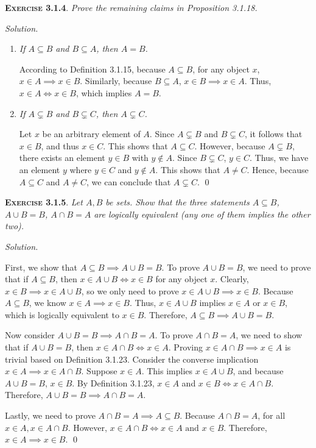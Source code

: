 \documentclass[12pt]{article}
\theoremstyle{remark}
\newenvironment{exer}[2]{
    \noindent \setlength{\parskip}{1em}%
    \textsc{\textbf{Exercise #1}}. \textit{#2} \par
    \noindent \textit{Solution.} %
}{\bigskip}
\begin{document}
\begin{exer}{3.1.4}{
    Prove the remaining claims in Proposition 3.1.18.
}
    \begin{enumerate}[topsep=0mm, label=(\alph*)]
        \item \textit{If $A \subseteq B$ and $B \subseteq A$, then $A = B$.}

            According to Definition 3.1.15, because $A \subseteq B$, for any object $x$, $x \in A \implies x \in B$.
            Similarly, because $B \subseteq A$, $x \in B \implies x \in A$.
            Thus, $x \in A \iff x \in B$, which implies $A = B$.

        \item \textit{If $A \subsetneq B$ and $B \subsetneq C$, then $A \subsetneq C$.}

            Let $x$ be an arbitrary element of $A$.
            Since $A \subsetneq B$ and $B \subsetneq C$, it follows that $x \in B$, and thus $x \in C$.
            This shows that $A \subseteq C$.
            However, because $A \subsetneq B$, there exists an element $y \in B$ with $y \notin A$.
            Since $B \subsetneq C$, $y \in C$.
            Thus, we have an element $y$ where $y \in C$ and $y \notin A$.
            This shows that $A \ne C$.
            Hence, because $A \subseteq C$ and $A \ne C$, we can conclude that $A \subsetneq C$. \qed
    \end{enumerate}
\end{exer}


\begin{exer}{3.1.5}{
    Let $A, B$ be sets.
    Show that the three statements $A \subseteq B$, $A \cup B = B$, $A \cap B = A$ are logically equivalent (any one of them implies the other two).
}
    First, we show that $A \subseteq B \implies A \cup B = B$.
    To prove $A \cup B = B$, we need to prove that if $A \subseteq B$, then $x \in A \cup B \iff x \in B$ for any object $x$.
    Clearly, $x \in B \implies x \in A \cup B$, so we only need to prove $x \in A \cup B \implies x \in B$.
    Because $A \subseteq B$, we know $x \in A \implies x \in B$.
    Thus, $x \in A \cup B$ implies $x \in A$ or $x \in B$, which is logically equivalent to $x \in B$.
    Therefore, $A \subseteq B \implies A \cup B = B$.

    Now consider $A \cup B = B \implies A \cap B = A$.
    To prove $A \cap B = A$, we need to show that if $A \cup B = B$, then $x \in A \cap B \iff x \in A$.
    Proving $x \in A \cap B \implies x \in A$ is trivial based on Definition 3.1.23.
    Consider the converse implication $x \in A \implies x \in A \cap B$.
    Suppose $x \in A$.
    This implies $x \in A \cup B$, and because $A \cup B = B$, $x \in B$.
    By Definition 3.1.23, $x \in A$ and $x \in B \iff x \in A \cap B$.
    Therefore, $A \cup B = B \implies A \cap B = A$.

    Lastly, we need to prove $A \cap B = A \implies A \subseteq B$.
    Because $A \cap B = A$, for all $x \in A, x \in A \cap B$.
    However, $x \in A \cap B \iff x \in A \text{ and } x \in B$.
    Therefore, $x \in A \implies x \in B$. \qed
\end{exer}
\end{document}
